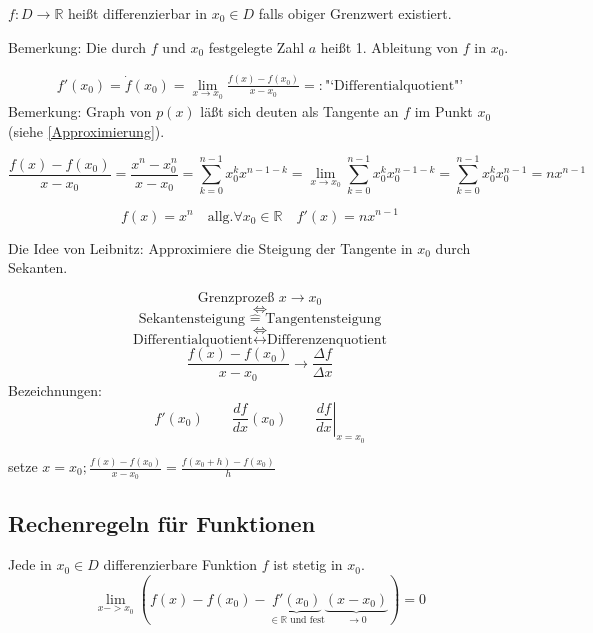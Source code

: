 \begin{definition}[1. Ableitung]
	\( f:D\rightarrow \mathbb{R} \) heißt differenzierbar in \( x_0 \in D \) falls obiger Grenzwert existiert.
\end{definition}
\noindent Bemerkung: Die durch \( f \) und \( x_0 \) festgelegte Zahl \( a \) heißt 1. Ableitung von \( f \) in \( x_0 \).

\begin{align*}
	f'(x_0) = \dot{f}(x_0) = \lim_{x\rightarrow x_0}\frac{f(x)-f(x_0)}{x-x_0} =:\text{"`Differentialquotient"'}
\end{align*}
Bemerkung: Graph von \( p(x) \) läßt sich deuten als Tangente an \( f \) im Punkt \( x_0 \) (siehe \ref{Approximierung}).

\begin{example}[Einfache Differentiationsgleichung \( f(x)=x^n \)]
\[
	\frac{f(x)-f(x_0)}{x-x_0} 
	=\frac{x^n-x_0^n}{x-x_0}
	= \sum_{k=0}^{n-1}x_0^kx^{n-1-k}
	= \lim_{x \rightarrow x_0} \sum_{k=0}^{n-1}x_0^kx_0^{n-1-k} 
	= \sum_{k=0}^{n-1}x_0^kx_0^{n-1} = nx^{n-1} 
\]

\[
	f(x)=x^n \quad \text{allg.} \forall x_0 \in \mathbb{R} \quad f'(x)=nx^{n-1}
\]
\end{example}
\noindent Die Idee von Leibnitz: Approximiere die Steigung der Tangente in \( x_0 \) durch Sekanten.


\[	\text{Grenzprozeß } x \rightarrow x_0 \]
\[	\Leftrightarrow \]
\[	\text{Sekantensteigung } \hat{=} \text{ Tangentensteigung} \]
\[	\Leftrightarrow \]
\[	\text{Differentialquotient} \leftrightarrow \text{Differenzenquotient} \]
\[	\frac{f(x)-f(x_0)}{x-x_0} \rightarrow \frac{\Delta f}{\Delta x}\]
Bezeichnungen:
\[
	f'(x_0) \qquad \frac{df}{dx}(x_0) \qquad \left.\frac{df}{dx}\right|_{x=x_0}
\]

setze \( x = x_0; \frac{f(x)-f(x_0)}{x-x_0} = \frac{f(x_0+h)-f(x_0)}{h}\)

\subsection{Rechenregeln für Funktionen}
\label{sec:rechenregeln_f_funktionen}

\begin{theorem}[1. Aussage]
	Jede in \( x_0 \in D \) differenzierbare Funktion \( f \) ist stetig in \( x_0\).
	\[ \lim_{x->x_0} (f(x)-f(x_0)-\underbrace{f'(x_0)}_{\in \mathbb{R} \text{ und fest} }\underbrace{(x-x_0)}_{\rightarrow 0}) = 0 \]
\end{theorem}

